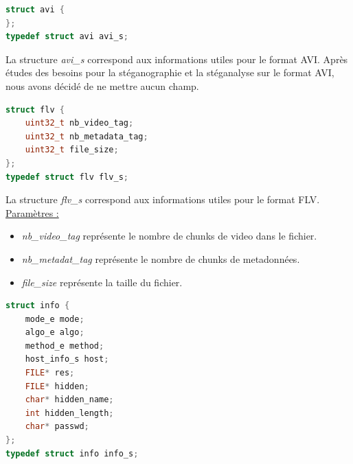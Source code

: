 \documentclass[11pt]{article}
\begin{document}
\begin{lstlisting}[language=c]
struct avi {
};
typedef struct avi avi_s;
\end{lstlisting}

La structure \textit{avi\_s} correspond aux informations 
utiles pour le format AVI.  
\newline
Après études des besoins pour la stéganographie et la stéganalyse sur le 
format AVI, nous avons décidé de ne mettre aucun champ.  
\newline

\begin{lstlisting}[language=c]
struct flv {
    uint32_t nb_video_tag;
    uint32_t nb_metadata_tag;
    uint32_t file_size;
};
typedef struct flv flv_s;
\end{lstlisting}

La structure \textit{flv\_s} correspond aux informations 
utiles pour le format FLV.  
\newline
\underline{Paramètres :}
\begin{itemize}
\item \textit{nb\_video\_tag} représente le nombre de chunks de video dans 
le fichier. 
\item \textit{nb\_metadat\_tag} représente le nombre de chunks de metadonnées. 
\item \textit{file\_size} représente la taille du fichier. 
\newline
\end{itemize}

\begin{lstlisting}[language=c]
struct info {
    mode_e mode;  
    algo_e algo; 
    method_e method;            
    host_info_s host;           
    FILE* res;                 
    FILE* hidden;              
    char* hidden_name;
    int hidden_length; 
    char* passwd;
};
typedef struct info info_s;
\end{lstlisting}
\end{document}
